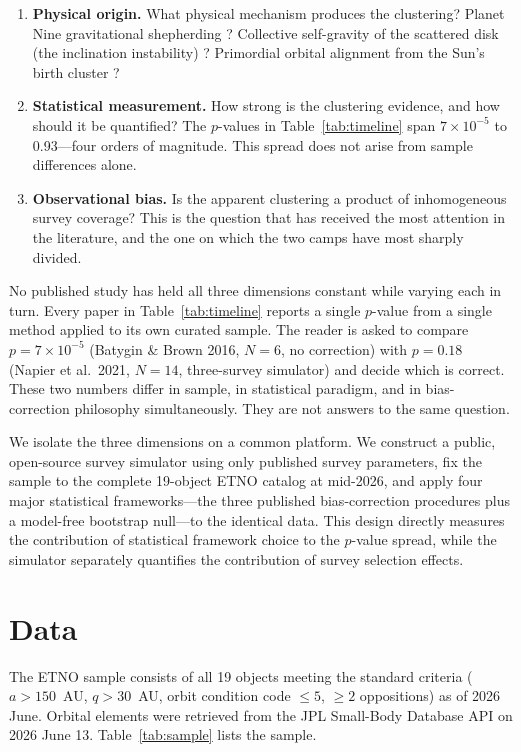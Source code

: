 \documentclass[12pt,a4paper]{article}
\begin{document}
\begin{enumerate}
    \item \textbf{Physical origin.} What physical mechanism produces the clustering? Planet Nine gravitational shepherding \cite{batygin2016,brown2019}? Collective self-gravity of the scattered disk (the inclination instability) \cite{madigan2018,zderic2020}? Primordial orbital alignment from the Sun's birth cluster \cite{trujillo2014}?
    \item \textbf{Statistical measurement.} How strong is the clustering evidence, and how should it be quantified? The $p$-values in Table~\ref{tab:timeline} span $7\times10^{-5}$ to 0.93---four orders of magnitude. This spread does not arise from sample differences alone.
    \item \textbf{Observational bias.} Is the apparent clustering a product of inhomogeneous survey coverage? This is the question that has received the most attention in the literature, and the one on which the two camps have most sharply divided.
\end{enumerate}

No published study has held all three dimensions constant while varying each in turn. Every paper in Table~\ref{tab:timeline} reports a single $p$-value from a single method applied to its own curated sample. The reader is asked to compare $p=7\times10^{-5}$ (Batygin \& Brown 2016, $N=6$, no correction) with $p=0.18$ (Napier et al.\ 2021, $N=14$, three-survey simulator) and decide which is correct. These two numbers differ in sample, in statistical paradigm, and in bias-correction philosophy simultaneously. They are not answers to the same question.

We isolate the three dimensions on a common platform. We construct a public, open-source survey simulator using only published survey parameters, fix the sample to the complete 19-object ETNO catalog at mid-2026, and apply four major statistical frameworks---the three published bias-correction procedures plus a model-free bootstrap null---to the identical data. This design directly measures the contribution of statistical framework choice to the $p$-value spread, while the simulator separately quantifies the contribution of survey selection effects.

\section{Data}

The ETNO sample consists of all 19 objects meeting the standard criteria ($a>150$~AU, $q>30$~AU, orbit condition code $\leq5$, $\geq2$ oppositions) as of 2026 June. Orbital elements were retrieved from the JPL Small-Body Database API on 2026 June 13. Table~\ref{tab:sample} lists the sample.
\end{document}

